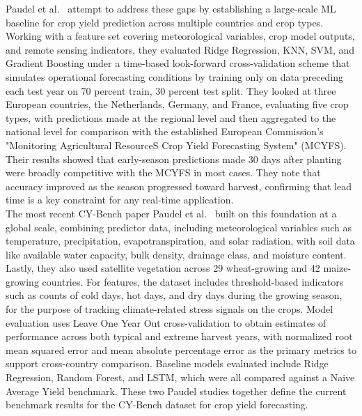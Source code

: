\documentclass[pdflatex,sn-mathphys-num, oneside, 11pt]{sn-jnl}%
\theoremstyle{thmstyleone}%
\theoremstyle{thmstyletwo}%
\theoremstyle{thmstylethree}%
\begin{document}
Paudel et al.~\cite{bib16} attempt to address these gaps by establishing a large-scale ML baseline for crop yield prediction across multiple countries and crop types. Working with a feature set covering meteorological variables, crop model outputs, and remote sensing indicators, they evaluated Ridge Regression, KNN, SVM, and Gradient Boosting under a time-based look-forward cross-validation scheme that simulates operational forecasting conditions by training only on data preceding each test year on 70 percent train, 30 percent test split. They looked at three European countries, the Netherlands, Germany, and France, evaluating five crop types, with predictions made at the regional level and then aggregated to the national level for comparison with the established European Commission’s "Monitoring Agricultural ResourceS Crop Yield Forecasting System" (MCYFS). Their results showed that early-season predictions made 30 days after planting were broadly competitive with the MCYFS in most cases. They note that accuracy improved as the season progressed toward harvest, confirming that lead time is a key constraint for any real-time application.\\
 
The most recent CY-Bench paper Paudel et al.~\cite{bib17} built on this foundation at a global scale, combining predictor data, including meteorological variables such as temperature, precipitation, evapotranspiration, and solar radiation, with soil data like available water capacity, bulk density, drainage class, and moisture content. Lastly, they also used satellite vegetation across 29 wheat-growing and 42 maize-growing countries. For features, the dataset includes threshold-based indicators such as counts of cold days, hot days, and dry days during the growing season, for the purpose of tracking climate-related stress signals on the crops. Model evaluation uses Leave One Year Out cross-validation to obtain estimates of performance across both typical and extreme harvest years, with normalized root mean squared error and mean absolute percentage error as the primary metrics to support cross-country comparison. Baseline models evaluated include Ridge Regression, Random Forest, and LSTM, which were all compared against a Naive Average Yield benchmark. These two Paudel studies together define the current benchmark results for the CY-Bench dataset for crop yield forecasting.\\
 
\end{document}
